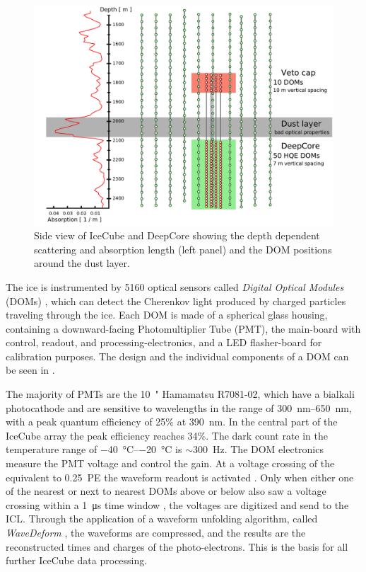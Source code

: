 \begin{figure}[h]
    \includegraphics{figures/icecube_deepcore/DeepCore_sideview.pdf}
	\caption[IceCube sideview]{Side view of IceCube and DeepCore showing the depth dependent scattering and absorption length (left panel) and the DOM positions around the dust layer.}
\end{figure}


The ice is instrumented by 5160 optical sensors called \textit{Digital Optical Modules} (DOMs) , which can detect the Cherenkov light produced by charged particles traveling through the ice. Each DOM is made of a spherical glass housing, containing a downward-facing Photomultiplier Tube (PMT), the main-board with control, readout, and processing-electronics, and a LED flasher-board for calibration purposes. The design and the individual components of a DOM can be seen in .

The majority of PMTs are the \SI{10}{"} Hamamatsu R7081-02, which have a bialkali photocathode and are sensitive to wavelengths in the range of \SIrange{300}{650}{\nano\meter}, with a peak quantum efficiency of 25\% at \SI{390}{\nano\meter}. In the central part of the IceCube array the peak efficiency reaches 34\%. The dark count rate in the temperature range of \SIrange{-40}{-20}{\degreeCelsius} is $\sim$\SI{300}{\hertz}. The DOM electronics measure the PMT voltage and control the gain. At a voltage crossing of the equivalent to \SI{0.25}{PE} the waveform readout is activated . Only when either one of the nearest or next to nearest DOMs above or below also saw a voltage crossing within a \SI{1}{\micro\second} time window , the voltages are digitized and send to the ICL. Through the application of a waveform unfolding algorithm, called \textit{WaveDeform} , the waveforms are compressed, and the results are the reconstructed times and charges of the photo-electrons. This is the basis for all further IceCube data processing.

